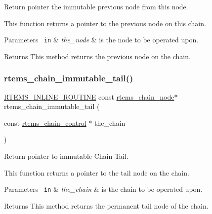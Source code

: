 Return pointer the immutable previous node from this node. 

This function returns a pointer to the previous node on this chain.


\begin{DoxyParams}[1]{Parameters}
\mbox{\texttt{ in}}  & {\em the\+\_\+node} & is the node to be operated upon.\\
\hline
\end{DoxyParams}
\begin{DoxyReturn}{Returns}
This method returns the previous node on the chain. 
\end{DoxyReturn}
\mbox{\label{group__ClassicChains_ga9b58da3ec9a1a90e6fc196d8783b7dc7}} 
\subsubsection{\texorpdfstring{rtems\_chain\_immutable\_tail()}{rtems\_chain\_immutable\_tail()}}
{\footnotesize\ttfamily \mbox{\hyperlink{group__RTEMSScoreBaseDefs_gac216239df231d5dbd15e3520b0b9313f}{R\+T\+E\+M\+S\+\_\+\+I\+N\+L\+I\+N\+E\+\_\+\+R\+O\+U\+T\+I\+NE}} const \mbox{\hyperlink{structChain__Node__struct}{rtems\+\_\+chain\+\_\+node}}$\ast$ rtems\+\_\+chain\+\_\+immutable\+\_\+tail (\begin{DoxyParamCaption}\item[{const \mbox{\hyperlink{unionChain__Control}{rtems\+\_\+chain\+\_\+control}} $\ast$}]{the\+\_\+chain }\end{DoxyParamCaption})}



Return pointer to immutable Chain Tail. 

This function returns a pointer to the tail node on the chain.


\begin{DoxyParams}[1]{Parameters}
\mbox{\texttt{ in}}  & {\em the\+\_\+chain} & is the chain to be operated upon.\\
\hline
\end{DoxyParams}
\begin{DoxyReturn}{Returns}
This method returns the permanent tail node of the chain. 
\end{DoxyReturn}
\mbox{\label{group__ClassicChains_ga4867b0d305def0e61d7c8d72216c638a}} 
